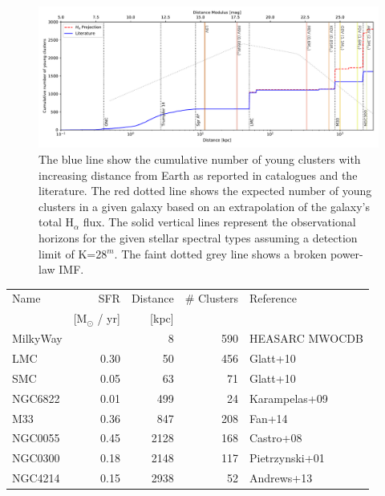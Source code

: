 \begin{figure}

    \centering
    \includegraphics[width=\textwidth]{images/young_clusters_within_2Mpc_incl_MW}

    \caption{The blue line show the cumulative number of young clusters with
    increasing distance from Earth as reported in catalogues and the literature.
    The red dotted line shows the expected number of young clusters in a given
    galaxy based on an extrapolation of the galaxy's total H$_\alpha$ flux. The
    solid vertical lines represent the observational horizons for the given
    stellar spectral types assuming a detection limit of K=28$^m$. The faint
    dotted grey line shows a broken power-law IMF.
    }
    \label{fig:resolved_stellar_densities}

\end{figure}


\begin{table}[]
    \begin{tabular}{lrrrl}
    Name     & SFR                  & Distance  & # Clusters & Reference      \\
             & [M$_\odot$ / yr]     & [kpc]     &            &                \\
    MilkyWay &                      & 8         & 590        & HEASARC MWOCDB \\
    LMC      & 0.30                 & 50        & 456        & Glatt+10       \\
    SMC      & 0.05                 & 63        & 71         & Glatt+10       \\
    NGC6822  & 0.01                 & 499       & 24         & Karampelas+09  \\
    M33      & 0.36                 & 847       & 208        & Fan+14         \\
    NGC0055  & 0.45                 & 2128      & 168        & Castro+08      \\
    NGC0300  & 0.18                 & 2148      & 117        & Pietrzynski+01 \\
    NGC4214  & 0.15                 & 2938      & 52         & Andrews+13     \\
    \end{tabular}
\end{table}








